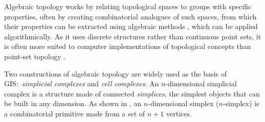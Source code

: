 Algebraic topology works by relating topological spaces to groups with specific properties, often by creating combinatorial analogues of such spaces, from which their properties can be extracted using algebraic methods \citep{Henle94}, which can be applied algorithmically.
As it uses discrete structures rather than continuous point sets, it is often more suited to computer implementations of topological concepts than point-set topology \citep[\S{}3.3.5]{Worboys04}.

Two constructions of algebraic topology are widely used as the basis of GIS:\ \emph{simplicial complexes} and \emph{cell complexes}.
An $n$-dimensional simplicial complex is a structure made of connected \emph{simplices}, the simplest objects that can be built in any dimension.
As shown in , an $n$-dimensional simplex ($n$-simplex) is a combinatorial primitive made from a set of $n+1$ vertices.
